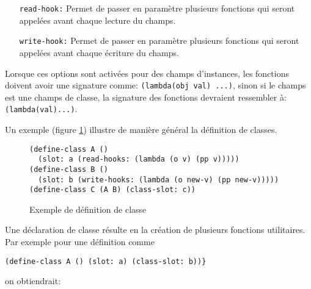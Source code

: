       \begin{itemize}
      \item[\texttt{read-hook:}] Permet de passer en paramètre
        plusieurs fonctions qui seront appelées avant chaque lecture
        du champs.
      \item[\texttt{write-hook:}] Permet de passer en paramètre
        plusieurs fonctions qui seront appelées avant chaque écriture
        du champs.
      \end{itemize}

      Lorsque ces options sont activées pour des champs d'instances,
      les fonctions doivent avoir une signature comme:
      \texttt{(lambda(obj val) ...)}, sinon si le champs est une
      champs de classe, la signature des fonctions devraient
      ressembler à: \texttt{(lambda(val)...)}.

      Un exemple (figure \ref{ex-defclass}) illustre de manière
      général la définition de classes.

      \begin{figure}[htbp!]
        \begin{lstlisting}
(define-class A () 
  (slot: a (read-hooks: (lambda (o v) (pp v)))))
(define-class B () 
  (slot: b (write-hooks: (lambda (o new-v) (pp new-v)))))
(define-class C (A B) (class-slot: c))
        \end{lstlisting}
        \caption{Exemple de définition de classe}
        \label{ex-defclass}
      \end{figure}

      Une déclaration de classe résulte en la création de plusieurs
      fonctions utilitaires. Par exemple pour une définition comme
      \begin{lstlisting}
(define-class A () (slot: a) (class-slot: b))}
      \end{lstlisting}
      on obtiendrait:

